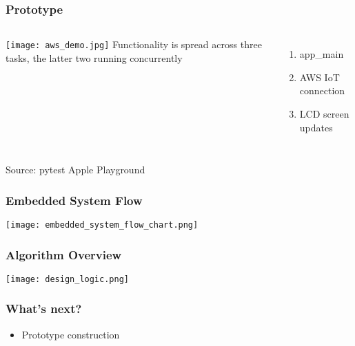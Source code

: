 \documentclass{beamer}
\begin{document}
\begin{frame}
  \frametitle{Prototype}
  \begin{columns}
    \texttt{[image: aws\_demo.jpg]}
    Functionality is spread across three tasks, the latter two running concurrently
    \begin{enumerate}
      \item app\_main
      \item AWS IoT connection
      \item LCD screen updates
    \end{enumerate}
  \end{columns}
  \hfill {\tiny Source: pytest Apple Playground}

\end{frame}

\begin{frame}
  \frametitle{Embedded System Flow}
  \texttt{[image: embedded\_system\_flow\_chart.png]}
\end{frame}

\begin{frame}
  \frametitle{Algorithm Overview}
  \texttt{[image: design\_logic.png]}
\end{frame}

\begin{frame}
  \frametitle{What's next?}
  \begin{itemize}
    \item Prototype construction
  \end{itemize}
\end{frame}
\end{document}
